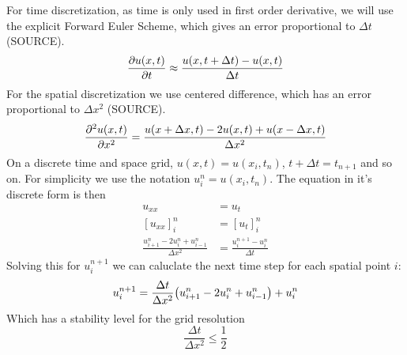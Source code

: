 For time discretization, as time is only used in first order derivative, we will use the explicit Forward Euler Scheme, which gives an error proportional to $\Delta t$ (SOURCE).
\begin{equation}
    \pdv{u(x,t)}{t} \approx \frac{u(x,t+\Delta t) - u(x,t)}{\Delta t}
    \label{eq:FE}
\end{equation}
For the spatial discretization we use centered difference, which has an error proportional to $\Delta x^2$ (SOURCE).
\begin{equation}
    \pdv[2]{u(x,t)}{x} = \frac{u(x+\Delta x,t) - 2u(x,t) + u(x-\Delta x,t)}{\Delta x^2}
    \label{eq:CD}
\end{equation}
On a discrete time and space grid, $u(x,t) = u(x_i,t_n)$, $t+\Delta t = t_{n+1}$ and so on.
For simplicity we use the notation $u_i^n = u(x_i,t_n)$. The equation in it's discrete form is then
\begin{equation}
\begin{split}
    u_{xx} &= u_t \\
    [u_{xx}]_i^n &= [u_t]_i^n \\
    \frac{u_{i+1}^n - 2u_i^n + u_{i-1}^n}{\Delta x^2} &= \frac{u_i^{n+1}-u_i^n}{\Delta t}
\end{split}
\end{equation}
Solving this for $u_i^{n+1}$ we can caluclate the next time step for each spatial point $i$:
\begin{equation}
    u_i^{n+1} = \frac{\Delta t}{\Delta x^2}\qty(u_{i+1}^n - 2u_i^n + u_{i-1}^n)  + u_i^n
    \label{eq:theAlgorithm}
\end{equation}
Which has a stability level for the grid resolution
\begin{equation*}
    \frac{\Delta t}{\Delta x^2} \leq \frac{1}{2}
\end{equation*}

